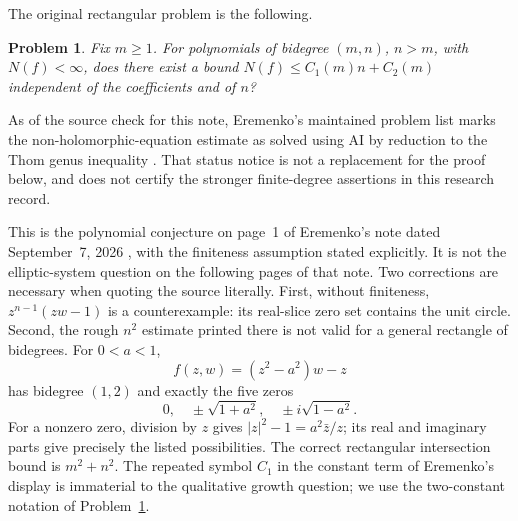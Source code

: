 \documentclass[UTF8,11pt]{ctexart}
\newtheorem{prob}[thm]{Problem}
\theoremstyle{definition}
\numberwithin{equation}{section}
\begin{document}
The original rectangular problem is the following.
\begin{prob}\label{core:problem}
Fix $m\ge1$. For polynomials of bidegree $(m,n)$, $n>m$, with $N(f)<\infty$, does there exist a bound $N(f)\le C_1(m)n+C_2(m)$ independent of the coefficients and of $n$?
\end{prob}

As of the source check for this note, Eremenko's maintained problem list
marks the non-holomorphic-equation estimate as solved using AI by reduction
to the Thom genus inequality \cite{Ere26b}. That status notice is not a
replacement for the proof below, and does not certify the stronger
finite-degree assertions in this research record.

This is the polynomial conjecture on page~1 of Eremenko's note dated September~7, 2026 \cite[p.~1]{Ere26}, with the finiteness assumption stated explicitly. It is not the elliptic-system question on the following pages of that note. Two corrections are necessary when quoting the source literally. First, without finiteness, $z^{n-1}(zw-1)$ is a counterexample: its real-slice zero set contains the unit circle. Second, the rough $n^2$ estimate printed there is not valid for a general rectangle of bidegrees. For $0<a<1$,
\[
 f(z,w)=(z^2-a^2)w-z
\]
has bidegree $(1,2)$ and exactly the five zeros
\[
 0,\quad \pm\sqrt{1+a^2},\quad \pm i\sqrt{1-a^2}.
\]
For a nonzero zero, division by $z$ gives $|z|^2-1=a^2\bar z/z$; its real and imaginary parts give precisely the listed possibilities. The correct rectangular intersection bound is $m^2+n^2$. The repeated symbol $C_1$ in the constant term of Eremenko's display is immaterial to the qualitative growth question; we use the two-constant notation of Problem~\ref{core:problem}.
\end{document}
